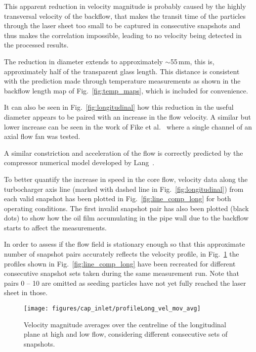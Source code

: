 This apparent reduction in velocity magnitude is probably caused by  the highly transversal velocity of the backflow, that makes the transit time of the particles through the laser sheet too small to be captured in consecutive snapshots and thus makes the correlation impossible, leading to no velocity being detected in the processed results.

The reduction in diameter extends to approximately $\sim$55\,mm, this is, approximately half of the transparent glass length. This distance is consistent with the prediction made through temperature measurements as shown in the backflow length map of Fig.~\ref{fig:temp_maps}, which is included for convenience.

It can also be seen in Fig.~\ref{fig:longitudinal} how this reduction in the useful diameter appears to be paired with an increase in the flow velocity. A similar but lower increase can be seen in the work of Fike et al.~\cite{fike2014visualisation} where a single channel of an axial flow fan was tested.

A similar constriction and acceleration of the flow is correctly predicted by the compressor numerical model developed by Lang~\cite{lang2011contribucion}.

To better quantify the increase in speed in the core flow, velocity data along the turbocharger axis line (marked with dashed line in Fig.~\ref{fig:longitudinal}) from each valid snapshot has been plotted in Fig.~\ref{fig:line_comp_long} for both operating conditions. The first invalid snapshot pair has also been plotted (black dots) to show how the oil film accumulating in the pipe wall due to the backflow starts to affect the measurements.

In order to assess if the flow field is stationary enough so that this approximate number of snapshot pairs accurately reflects the velocity profile, in Fig.~\ref{fig:line_comp_long_mov_avg} the profiles shown in Fig.~\ref{fig:line_comp_long} have been recreated for different consecutive snapshot sets taken during the same measurement run. Note that pairs 0 -- 10 are omitted as seeding particles have not yet fully reached the laser sheet in those.

\begin{figure}[thb!]
\centering
\texttt{[image: figures/cap\_inlet/profileLong\_vel\_mov\_avg]}
\caption[Velocity magnitude average evolution]{Velocity magnitude averages over the centreline of the longitudinal plane at high and low flow, considering different consecutive sets of snapshots.}
\label{fig:line_comp_long_mov_avg}
\end{figure}

